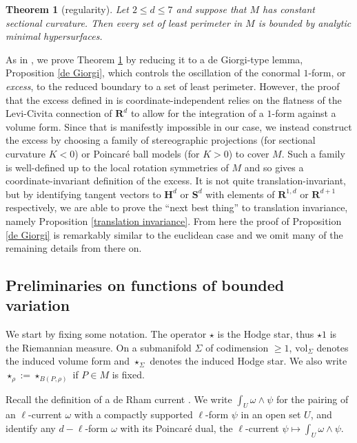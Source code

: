 \documentclass[reqno,10pt]{amsart}
\newcommand{\RR}{\mathbf{R}}
\newcommand{\Hyp}{\mathbf H}
\newcommand{\Sph}{\mathbf S}
\newcommand{\vol}{\mathrm{vol}}
\newcommand{\dfn}[1]{\emph{#1}\index{#1}}
\newtheorem{mainthm}{Theorem}
\theoremstyle{definition}
\numberwithin{equation}{section}
\begin{document}
\begin{mainthm}[regularity]\label{main lma}
Let $2 \leq d \leq 7$ and suppose that $M$ has constant sectional curvature.
Then every set of least perimeter in $M$ is bounded by analytic minimal hypersurfaces.
\end{mainthm}

As in \cite{Miranda66, Giusti77}, we prove Theorem \ref{main lma} by reducing it to a de Giorgi-type lemma, Proposition \ref{de Giorgi}, which controls the oscillation of the conormal $1$-form, or \dfn{excess}, to the reduced boundary to a set of least perimeter.
However, the proof that the excess defined in \cite{Miranda66, Giusti77} is coordinate-independent relies on the flatness of the Levi-Civita connection of $\RR^d$ to allow for the integration of a $1$-form against a volume form.
Since that is manifestly impossible in our case, we instead construct the excess by choosing a family of stereographic projections (for sectional curvature $K < 0$) or Poincar\'e ball models (for $K > 0$) to cover $M$.
Such a family is well-defined up to the local rotation symmetries of $M$ and so gives a coordinate-invariant definition of the excess.
It is not quite translation-invariant, but by identifying tangent vectors to $\Hyp^d$ or $\Sph^d$ with elements of $\RR^{1, d}$ or $\RR^{d + 1}$ respectively, we are able to prove the ``next best thing'' to translation invariance, namely Proposition \ref{translation invariance}.
From here the proof of Proposition \ref{de Giorgi} is remarkably similar to the euclidean case and we omit many of the remaining details from there on.

\subsection{Preliminaries on functions of bounded variation}\label{prelims}
We start by fixing some notation. The operator $\star$ is the Hodge star, thus $\star 1$ is the Riemannian measure.
On a submanifold $\Sigma$ of codimension $\geq 1$, $\vol_\Sigma$ denotes the induced volume form and $\star_\Sigma$ denotes the induced Hodge star. We also write $\star_\rho := \star_{B(P, \rho)}$ if $P \in M$ is fixed.

Recall the definition of a de Rham current \cite{simon1983GMT}.
We write $\int_U \omega \wedge \psi$ for the pairing of an $\ell$-current $\omega$ with a compactly supported $\ell$-form $\psi$ in an open set $U$, and identify any $d - \ell$-form $\omega$ with its Poincar\'e dual, the $\ell$-current $\psi \mapsto \int_U \omega \wedge \psi$.
\end{document}
